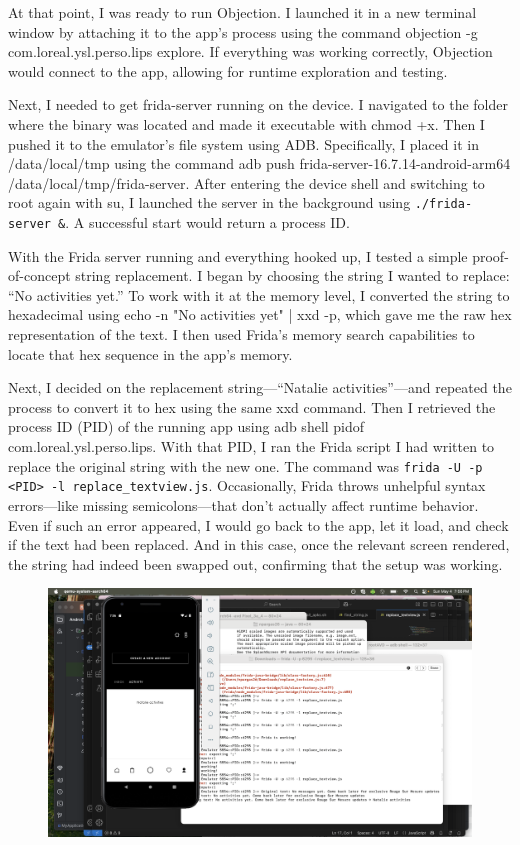 At that point, I was ready to run Objection. I launched it in a new terminal window by attaching it to the app’s process using the command objection -g com.loreal.ysl.perso.lips explore. If everything was working correctly, Objection would connect to the app, allowing for runtime exploration and testing.

Next, I needed to get frida-server running on the device. I navigated to the folder where the binary was located and made it executable with chmod +x. Then I pushed it to the emulator’s file system using ADB. Specifically, I placed it in /data/local/tmp using the command adb push frida-server-16.7.14-android-arm64 /data/local/tmp/frida-server. After entering the device shell and switching to root again with su, I launched the server in the background using \texttt{./frida-server \&}. A successful start would return a process ID.

With the Frida server running and everything hooked up, I tested a simple proof-of-concept string replacement. I began by choosing the string I wanted to replace: “No activities yet.” To work with it at the memory level, I converted the string to hexadecimal using echo -n "No activities yet" | xxd -p, which gave me the raw hex representation of the text. I then used Frida’s memory search capabilities to locate that hex sequence in the app’s memory.

Next, I decided on the replacement string—“Natalie activities”—and repeated the process to convert it to hex using the same xxd command. Then I retrieved the process ID (PID) of the running app using adb shell pidof com.loreal.ysl.perso.lips. With that PID, I ran the Frida script I had written to replace the original string with the new one. The command was \texttt{frida -U -p <PID> -l replace\_textview.js}. Occasionally, Frida throws unhelpful syntax errors—like missing semicolons—that don’t actually affect runtime behavior. Even if such an error appeared, I would go back to the app, let it load, and check if the text had been replaced. And in this case, once the relevant screen rendered, the string had indeed been swapped out, confirming that the setup was working.

\begin{figure}
	\centering
	\includegraphics[scale=.17]{Natalie_activities}
	\caption{}
	\label{fig:natalieactivities}
\end{figure}
